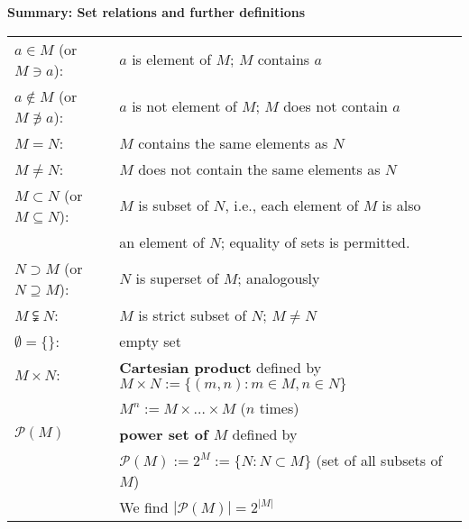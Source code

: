 \begin{frame}
	\textbf{\large Summary: Set relations and further definitions}\\
	\vspace{0.2cm}
	\begin{table}[h] \color{defgruen}
		\begin{tabular}[t]{ll}
			$a \in M$ (or $M \ni a$): & $a$ is element of $M$; $M$ contains $a$\\\vspace{0.2cm}
			$a \not\in M$ (or $M \not\ni a$): & $a$ is not element of $M$; $M$ does not contain $a$\\[3pt]
			$M=N$: & $M$ contains the same elements as $N$\\\vspace{0.2cm}
			$M\not=N$: & $M$ does not contain the same elements as $N$\\\vspace{0.2cm}
			$M \subset N$ (or $M\subseteq N$): & $M$ is subset of $N$, i.e., each element of $M$ is also \\\vspace{0.2cm}
			& an element of $N$; equality of sets is permitted.\\\vspace{0.2cm}
			$N \supset M$ (or $N\supseteq M$): & $N$ is superset of $M$; analogously\\\vspace{0.2cm}
			$M \subsetneqq N$: & $M$ is strict subset of $N$; $M\not=N$\\\vspace{0.2cm}
			$\emptyset = \{\}$: & empty set\\\vspace{0.2cm}
			$M \times N$: & \textbf{Cartesian product} defined by 
			$M \times N :=\{(m,n)\colon m\in M,n\in N  \}$\\\vspace{0.4cm}
			& $M^n := M \times \ldots \times M$ ($n$ times)\\\vspace{0.2cm}
			$\mathcal{P} (M)$  & \textbf{power set of $M$} defined by\\
			&$\mathcal{P} (M) := 2^M :=\{ N: N\subset M\} $ (set of all subsets of $M$)\\
			&\vspace{0.2cm}We find $|\mathcal{P} (M)| = 2^{|M|}$
		\end{tabular}
	\end{table}
\end{frame}






